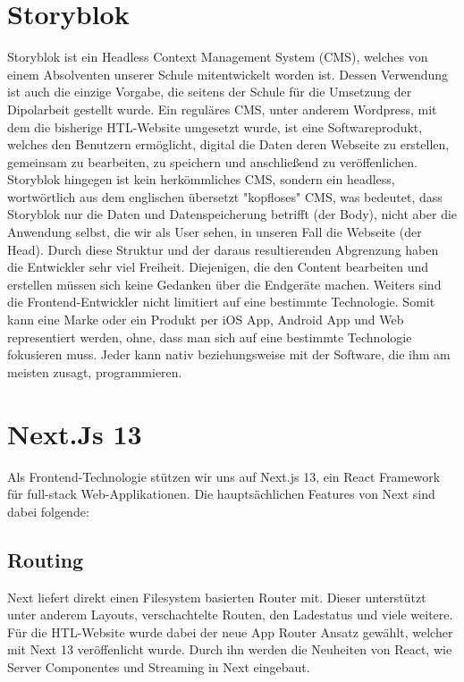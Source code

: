 \section{Storyblok}

Storyblok ist ein Headless Context Management System (CMS), welches von einem Absolventen unserer Schule mitentwickelt worden ist.
Dessen Verwendung ist auch die einzige Vorgabe, die seitens der Schule für die Umsetzung der Dipolarbeit gestellt wurde. 
Ein reguläres CMS, unter anderem Wordpress, mit dem die bisherige HTL-Website umgesetzt wurde, ist eine Softwareprodukt, 
welches den Benutzern ermöglicht, digital die Daten deren Webseite zu erstellen, gemeinsam zu bearbeiten, zu speichern 
und anschließend zu veröffenlichen.
Storyblok hingegen ist kein herkömmliches CMS, sondern ein headless, wortwörtlich aus dem englischen übersetzt "kopfloses" CMS, 
was bedeutet, dass Storyblok nur die Daten und Datenspeicherung betrifft (der Body), nicht aber die Anwendung selbst, die wir als User sehen, in unseren Fall die Webseite (der Head).
Durch diese Struktur und der daraus resultierenden Abgrenzung haben die Entwickler sehr viel Freiheit. Diejenigen, die den Content bearbeiten und erstellen müssen sich keine Gedanken über die Endgeräte machen.
Weiters sind die Frontend-Entwickler nicht limitiert auf eine bestimmte Technologie. Somit kann eine Marke oder ein Produkt per iOS App, Android App und Web representiert werden, ohne, 
dass man sich auf eine bestimmte Technologie fokusieren muss. Jeder kann nativ beziehungsweise mit der Software, die ihm am meisten zusagt, programmieren.

\section{Next.Js 13}
Als Frontend-Technologie stützen wir uns auf Next.js 13, ein React Framework für full-stack Web-Applikationen. 
Die hauptsächlichen Features von Next sind dabei folgende:

\subsection{Routing}
Next liefert direkt einen Filesystem basierten Router mit. Dieser unterstützt unter anderem Layouts, verschachtelte Routen, den Ladestatus und viele weitere.
Für die HTL-Website wurde dabei der neue App Router Ansatz gewählt, welcher mit Next 13 veröffenlicht wurde. Durch ihn werden die Neuheiten von React, wie Server Componentes und Streaming in Next eingebaut.

